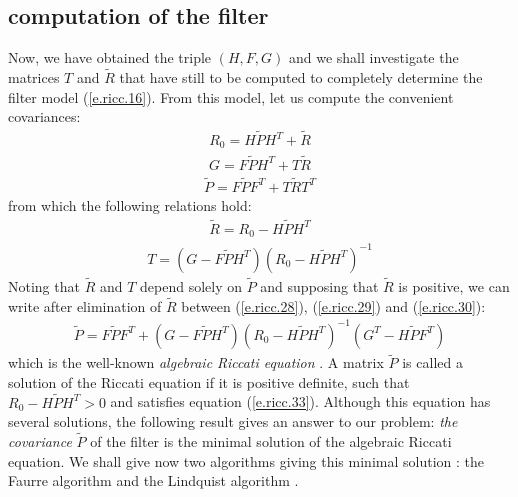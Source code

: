 \subsection{computation of the filter}
Now, we have obtained the triple $(H, F, G)$ and we shall
investigate the matrices $T$ and $\tilde{R}$ that have still 
to be computed to completely determine the filter model (\ref{e.ricc.16}).
From this model, let us compute the convenient covariances:\\
\begin{eqnarray}
R_0=H\tilde{P}H^T+\tilde{R}
\label{e.ricc.28}
\end{eqnarray}
\begin{eqnarray}
G=F\tilde{P}H^T+T\tilde{R}
\label{e.ricc.29}
\end{eqnarray}
\begin{eqnarray}
\tilde{P}=F\tilde{P}F^T+T\tilde{R}T^T
\label{e.ricc.30}
\end{eqnarray}
from which the following relations hold:
\begin{eqnarray}
\tilde{R}=R_0-H\tilde{P}H^T
\label{e.ricc.31}
\end{eqnarray}
\begin{eqnarray}
T=(G-F\tilde{P}H^T)(R_0-H\tilde{P}H^T)^{-1}
\label{e.ricc.32}
\end{eqnarray}
Noting that $\tilde{R}$ and $T$ depend solely on $\tilde{P}$ 
and supposing that $\tilde{R}$ is positive, we can write after
elimination of $\tilde{R}$ between (\ref{e.ricc.28}), (\ref{e.ricc.29}) and (\ref{e.ricc.30}):
\begin{eqnarray}
\tilde{P}=F\tilde{P}F^T+(G-F\tilde{P}H^T)(R_0-H\tilde{P}H^T)^{-1}(G^T-H\tilde{P}F^T)
\label{e.ricc.33}
\end{eqnarray}
which is the well-known {\em algebraic Riccati equation} 
. A matrix
$\tilde{P}$ is called a solution of the Riccati equation if it is 
positive definite, such that $R_0-H\tilde{P}H^T>0$ and satisfies equation (\ref{e.ricc.33}). Although this equation has several solutions, 
the following result gives an answer to our problem: {\em the covariance}
$\tilde{P}$ of the filter is the minimal solution of the algebraic
Riccati equation. We shall give now two algorithms 
giving this minimal solution : the Faurre algorithm  
and the Lindquist algorithm . 
